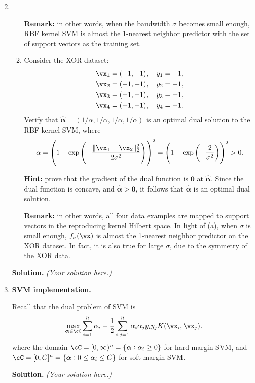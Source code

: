 \documentclass{article}
\def\balpha{\boldsymbol{\alpha}}
\theoremstyle{definition}
\theoremstyle{remark}
\newenvironment{Q}
{%
\clearpage
\item
}
{%
\phantom{s}
\bigskip
\textbf{Solution.}
\emph{(Your solution here.)}
}
\begin{document}
\begin{enumerate}
\begin{Q}
\begin{enumerate}
        \textbf{Remark:} in other words, when the bandwidth $\sigma$ becomes small enough, RBF kernel SVM is almost the 1-nearest neighbor predictor with the set of support vectors as the training set.

        \item Consider the XOR dataset:
        \begin{align*}
            \vx_1=(+1,+1),\quad y_1=+1, \\
            \vx_2=(-1,+1),\quad y_2=-1, \\
            \vx_3=(-1,-1),\quad y_3=+1, \\
            \vx_4=(+1,-1),\quad y_4=-1.
        \end{align*}
        Verify that $\hat{\balpha}=(1/\alpha,1/\alpha,1/\alpha,1/\alpha)$ is an optimal dual solution to the RBF kernel SVM, where
        \begin{align*}
            \alpha=\del{1-\exp\del{-\frac{\|\vx_1-\vx_2\|_2^2}{2\sigma^2}}}^2=\del{1-\exp\del{-\frac{2}{\sigma^2}}}^2>0.
        \end{align*}

        \textbf{Hint:} prove that the gradient of the dual function is $\boldsymbol{0}$ at $\hat{\balpha}$. Since the dual function is concave, and $\hat{\balpha}>\boldsymbol{0}$, it follows that $\hat{\balpha}$ is an optimal dual solution.

        \textbf{Remark:} in other words, all four data examples are mapped to support vectors in the reproducing kernel Hilbert space. In light of (a), when $\sigma$ is small enough, $f_{\sigma}(\vx)$ is almost the 1-nearest neighbor predictor on the XOR dataset. In fact, it is also true for large $\sigma$, due to the symmetry of the XOR data.
    \end{enumerate}
\end{Q}

\begin{Q}
    \textbf{SVM implementation.}

    Recall that the dual problem of SVM is
    \begin{align*}
        \max_{\balpha\in\cC}\sum_{i=1}^{n}\alpha_i-\frac{1}{2}\sum_{i,j=1}^{n}\alpha_i\alpha_jy_iy_jK(\vx_i,\vx_j).
    \end{align*}
    where the domain $\cC=[0,\infty)^n=\{\balpha:\alpha_i\ge0\}$ for hard-margin SVM, and $\cC=[0,C]^n=\{\balpha:0\le\alpha_i\le C\}$ for soft-margin SVM.


\end{Q}
\end{enumerate}
\end{document}
